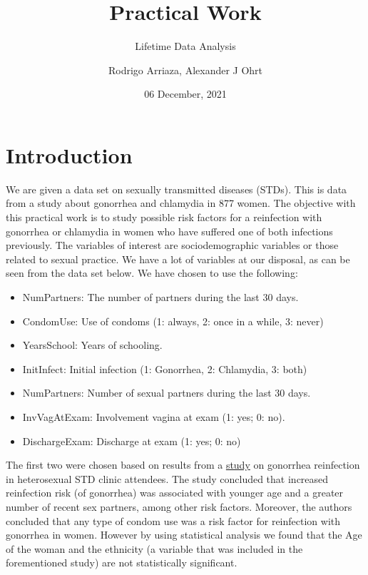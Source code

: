 \documentclass[
]{article}
\title{Practical Work}
\subtitle{Lifetime Data Analysis}
\author{Rodrigo Arriaza, Alexander J Ohrt}
\date{06 December, 2021}
\providecommand{\tightlist}{%
  \setlength{\itemsep}{0pt}\setlength{\parskip}{0pt}}
\begin{document}
\maketitle

\hypertarget{introduction}{%
\section{Introduction}\label{introduction}}

We are given a data set on sexually transmitted diseases (STDs). This is data from a study about gonorrhea and chlamydia in 877 women. The objective with this practical work is to study possible risk factors for a reinfection with gonorrhea or chlamydia in women who have suffered one of both infections previously. The variables of interest are sociodemographic variables or those related to sexual practice. We have a lot of variables at our disposal, as can be seen from the data set below. We have chosen to use the following:

\begin{itemize}
\tightlist
\item
  NumPartners: The number of partners during the last 30 days.
\item
  CondomUse: Use of condoms (1: always, 2: once in a while, 3: never)
\item
  YearsSchool: Years of schooling.
\item
  InitInfect: Initial infection (1: Gonorrhea, 2: Chlamydia, 3: both)
\item
  NumPartners: Number of sexual partners during the last 30 days.
\item
  InvVagAtExam: Involvement vagina at exam (1: yes; 0: no).
\item
  DischargeExam: Discharge at exam (1: yes; 0: no)
\end{itemize}

The first two were chosen based on results from a \href{https://www.ncbi.nlm.nih.gov/pmc/articles/PMC1744639/}{study} on gonorrhea reinfection in heterosexual STD clinic attendees. The study concluded that increased reinfection risk (of gonorrhea) was associated with younger age and a greater number of recent sex partners, among other risk factors. Moreover, the authors concluded that any type of condom use was a risk factor for reinfection with gonorrhea in women. However by using statistical analysis we found that the Age of the woman and the ethnicity (a variable that was included in the forementioned study) are not statistically significant.
\end{document}
